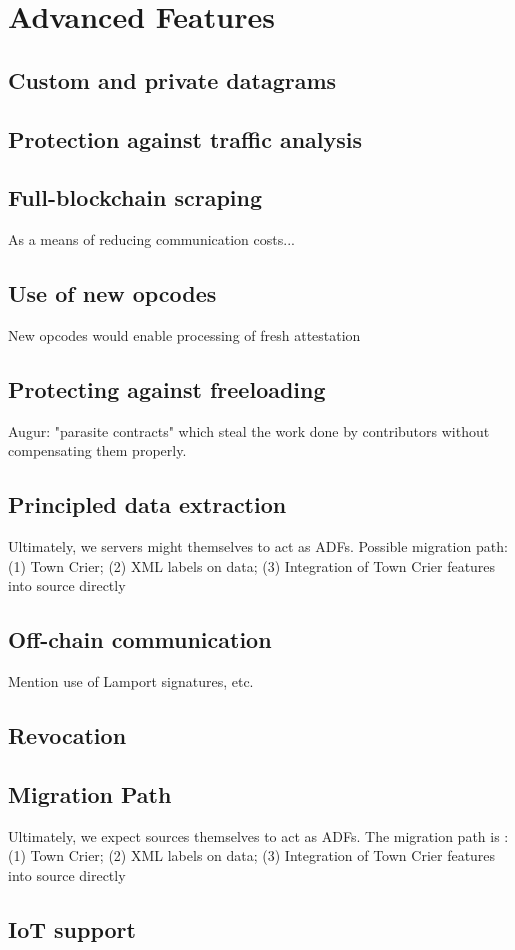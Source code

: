 \section{Advanced Features}
\subsection{Custom and private datagrams}
\subsection{Protection against traffic analysis}
\subsection{Full-blockchain scraping}
As a means of reducing communication costs...
\subsection{Use of new opcodes}
New opcodes would enable processing of fresh attestation
\subsection{Protecting against freeloading}
Augur:
"parasite contracts" which steal the work done by contributors without compensating them properly.
\subsection{Principled data extraction}
Ultimately, we servers might themselves to act as ADFs. Possible migration path: (1) Town Crier; (2) XML labels on data; (3) Integration of Town Crier features into source directly
\subsection{Off-chain communication}
Mention use of Lamport signatures, etc.
\subsection{Revocation}
\subsection{Migration Path}
Ultimately, we expect sources themselves to act as ADFs. The migration path is : (1) Town Crier; (2) XML labels on data; (3) Integration of Town Crier features into source directly
\subsection{IoT support}

